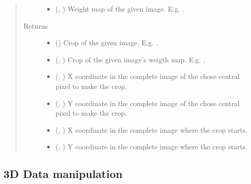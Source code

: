 \documentclass[letterpaper,10pt,english]{sphinxmanual}
\begin{document}
\begin{fulllineitems}
\begin{quote}
\begin{description}
\begin{itemize}
\item {} 
 (, ) \textendash{} Weight map of the given image. E.g. .

\end{itemize}

\item[{Returns}] \leavevmode
\begin{itemize}
\item {} 
 () \textendash{} Crop of the given image. E.g. .

\item {} 
 (, ) \textendash{} Crop of the given image’s weigth map. E.g. .

\item {} 
 (, ) \textendash{} X coordinate in the complete image of the chose central pixel to make the crop.

\item {} 
 (, ) \textendash{} Y coordinate in the complete image of the chose central pixel to make the crop.

\item {} 
 (, ) \textendash{} X coordinate in the complete image where the crop starts.

\item {} 
 (, ) \textendash{} Y coordinate in the complete image where the crop starts.

\end{itemize}


\end{description}\end{quote}

\end{fulllineitems}



\subsection{3D Data manipulation}
\label{\detokenize{data/data_3d_manipulation:module-data.data_3D_manipulation}}\label{\detokenize{data/data_3d_manipulation:d-data-manipulation}}\label{\detokenize{data/data_3d_manipulation::doc}}
\end{document}
